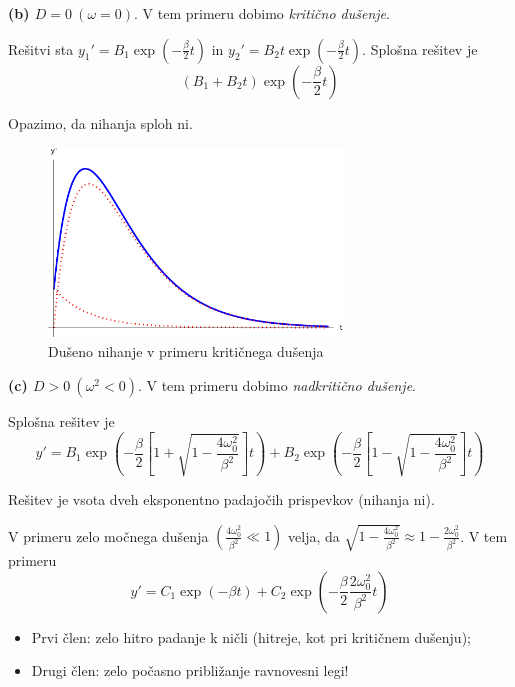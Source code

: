 \newpage
\textbf{(b) \(D = 0 \ (\omega = 0)\)}. V tem primeru dobimo \emph{kritično dušenje}.

Rešitvi sta \(y_1' = B_1 \exp \left(-\frac{\beta}{2}t\right)\) in \(y_2' = B_2 t \exp \left(-\frac{\beta}{2}t\right)\). Splošna rešitev je 
\[\boxed{(B_1 + B_2t) \exp \left(-\frac{\beta}{2} t\right)}\]

\begin{opomba}
    Opazimo, da nihanja sploh ni.
\end{opomba}

\begin{figure}[h!]
    \centering
    \includegraphics[width=0.7\textwidth]{img/01_003.pdf}
    \caption{Dušeno nihanje v primeru kritičnega dušenja}      
\end{figure}

\textbf{(c) \(D > 0 \ (\omega^2 < 0)\)}. V tem primeru dobimo \emph{nadkritično dušenje}. 

Splošna rešitev je 
\[
\boxed{y' = B_1 \exp \left(- \frac{\beta}{2} \left[1 + \sqrt{1 - \frac{4 \omega_0^2}{\beta^2}}\right]t\right) + B_2 \exp \left(- \frac{\beta}{2} \left[1 - \sqrt{1 - \frac{4 \omega_0^2}{\beta^2}}\right]t\right)} 
\]

\begin{opomba}
    Rešitev je vsota dveh eksponentno padajočih prispevkov (nihanja ni).
\end{opomba}

V primeru zelo močnega dušenja \((\frac{4\omega_0^2}{\beta^2} \ll 1)\) velja, da \(\sqrt{1 - \frac{4 \omega_0^2}{\beta^2}} \approx 1 - \frac{2\omega_0^2}{\beta^2}\). V tem primeru 
\[
y' = C_1 \exp (-\beta t) + C_2 \exp \left(-\frac{\beta}{2} \frac{2 \omega_0^2}{\beta^2}t\right)
\]

\begin{itemize}
    \item Prvi člen: zelo hitro padanje k ničli (hitreje, kot pri kritičnem dušenju);
    \item Drugi člen: zelo počasno približanje ravnovesni legi!
\end{itemize}

